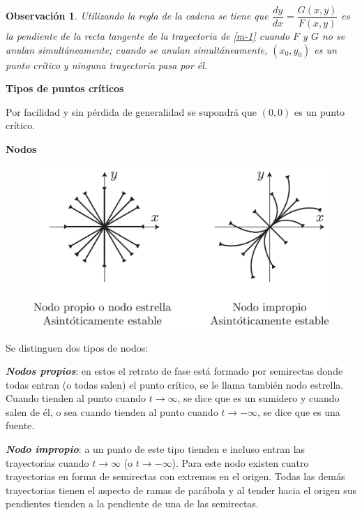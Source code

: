 \documentclass[a5paper,doc,10pt,noapacite]{apa6}
\newtheorem{observ}{Observación}
\newcommand{\neodefi}[1]{%
	\vspace{1\baselineskip}
	\textbf{\small#1} \newline
}
\begin{document}
{{\begin{observ}
	Utilizando la regla de la cadena se tiene que \(\dfrac{dy}{dx}=\dfrac{G(x,y)}{F(x,y)}\) es la pendiente de la recta tangente de la trayectoria de \eqref{m-1} cuando \(F\) y \(G\) no se anulan simultáneamente; cuando se anulan simultáneamente, \((x_0,y_0)\) es un punto crítico y ninguna trayectoria pasa por él.
\end{observ}


\neodefi{Tipos de puntos críticos}


Por facilidad y sin pérdida de generalidad se supondrá que \((0,0)\) es un punto crítico.

%
\vspace{0.75\baselineskip}
	\textbf{Nodos}\newline

\vspace{-1\baselineskip}
	\begin{figure}[H]
		\captionsetup{justification=centering, labelfont=footnotesize, font=footnotesize}
		\centering
		\includegraphics[scale=0.25]{Graficos/figura2}
		\caption{ }
		\label{fig:M-2}
	\end{figure}

Se distinguen dos tipos de nodos:
\begin{APAenumerate}
	\item \emph{\textbf{Nodos propios}}: en estos el retrato de fase está formado por semirectas donde todas entran (o todas salen) el punto crítico, se le llama también nodo estrella. Cuando tienden al punto cuando \(t\to\infty\), se dice que es un sumidero y cuando salen de él, o sea cuando tienden al punto cuando \(t\to-\infty\), se 	dice que es una fuente.
	
	\item \emph{\textbf{Nodo impropio}}: a un punto de este tipo tienden e incluso entran las trayectorias cuando \(t\to\infty\) (o \(t\to-\infty\)). Para este nodo existen cuatro trayectorias en forma de semirectas con extremos en el 	origen. Todas las demás trayectorias tienen el aspecto de ramas de parábola y al tender hacia el origen sus pendientes tienden a la pendiente de una de las semirectas.
\end{APAenumerate}

}}
\end{document}
